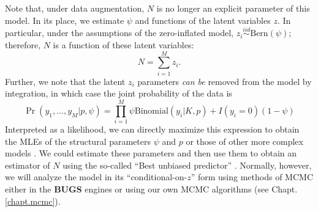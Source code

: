 Note that, under data augmentation, $N$ is no longer an explicit
parameter of this model. In its place, we estimate $\psi$ and
functions of the latent variables $z$. In particular, under the
assumptions of the zero-inflated model, $z_{i} \stackrel{iid}{\sim}
\mbox{Bern}(\psi)$; therefore, $N$ is a function of these latent
variables:
 \[
 N = \sum_{i=1}^{M} z_{i}.
\]
Further, we note that the latent $z_i$ parameters {\it can be} removed
 from
the model by integration, in which case the joint probability of the
data is
\begin{equation}
  \Pr(y_1, \ldots, y_M | p, \psi) = \prod_{i=1}^M  \psi \mathrm{Binomial}(y_i | K, p) +  I(y_i=0) (1-\psi)
\end{equation}
Interpreted as a likelihood, we can directly maximize this expression
to obtain the MLEs of the structural parameters $\psi$ and $p$ or
those of other more complex models \citep[e.g., see][]{royle:2006}. We
could estimate these parameters and then use them to obtain an
estimator of $N$ using the so-called ``Best unbiased predictor''
\citep[see][]{royle_dorazio:2011}. Normally, however, we will analyze
the model in its ``conditional-on-$z$'' form using methods of MCMC
either in the {\bf BUGS} engines or using our own MCMC algorithms (see
Chapt. \ref{chapt.mcmc}).

